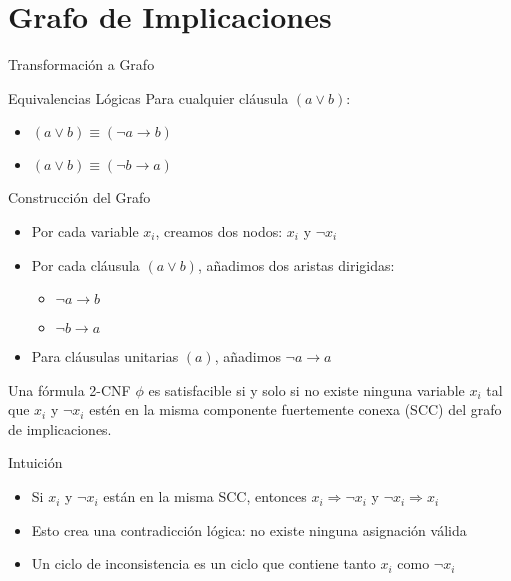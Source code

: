 \documentclass{beamer}
\begin{document}
\section{Grafo de Implicaciones}
\begin{frame}{Transformación a Grafo}
\begin{block}{Equivalencias Lógicas}
Para cualquier cláusula $(a \lor b)$:
\begin{itemize}
\item $(a \lor b) \equiv (\neg a \rightarrow b)$
\item $(a \lor b) \equiv (\neg b \rightarrow a)$
\end{itemize}
\end{block}

\begin{block}{Construcción del Grafo}
\begin{itemize}
\item Por cada variable $x_i$, creamos dos nodos: $x_i$ y $\neg x_i$
\item Por cada cláusula $(a \lor b)$, añadimos dos aristas dirigidas:
    \begin{itemize}
    \item $\neg a \rightarrow b$
    \item $\neg b \rightarrow a$
    \end{itemize}
\item Para cláusulas unitarias $(a)$, añadimos $\neg a \rightarrow a$
\end{itemize}
\end{block}
\end{frame}

\begin{frame}{}
\begin{theorem}
Una fórmula 2-CNF $\phi$ es satisfacible si y solo si no existe ninguna variable $x_i$ tal que $x_i$ y $\neg x_i$ estén en la misma componente fuertemente conexa (SCC) del grafo de implicaciones.
\end{theorem}

\begin{block}{Intuición}
\begin{itemize}
\item Si $x_i$ y $\neg x_i$ están en la misma SCC, entonces $x_i \Rightarrow \neg x_i$ y $\neg x_i \Rightarrow x_i$
\item Esto crea una contradicción lógica: no existe ninguna asignación válida
\item Un \alert{ciclo de inconsistencia} es un ciclo que contiene tanto $x_i$ como $\neg x_i$
\end{itemize}
\end{block}
\end{frame}
\end{document}
